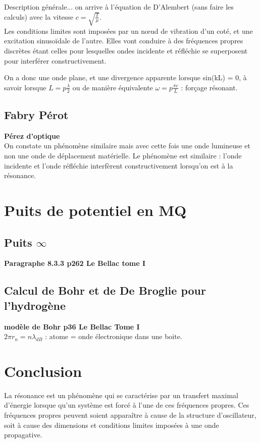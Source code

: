 \documentclass[12pt,prb,aps,epsf]{article}
\begin{document}
Description générale... on arrive à l'équation de D'Alembert (sans faire les calculs) avec la vitesse $c = \sqrt{\frac{T}{\mu}}$.\\

Les conditions limites sont imposées par un nœud de vibration d'un coté, et une excitation sinusoïdale de l'autre. Elles vont conduire à des fréquences propres discrètes étant celles pour lesquelles ondes incidente et réfléchie se superposent pour interférer constructivement.

On a donc une onde plane, et une divergence apparente lorsque sin(kL) = 0, à savoir lorsque $L= p\frac{\lambda}{2}$ ou de manière équivalente $\omega = p \frac{\pi c }{L}$ : forçage résonant. 

\subsection{Fabry Pérot}
\textbf{Pérez d'optique}\\
On constate un phénomène similaire mais avec cette fois une onde lumineuse et non une onde de déplacement matérielle. Le phénomène est similaire : l'onde incidente et l'onde réfléchie interfèrent constructivement lorsqu'on est à la résonance.

\section{Puits de potentiel en MQ}
\subsection{Puits $\infty$}
\textbf{Paragraphe 8.3.3 p262 Le Bellac tome I}

\subsection{Calcul de Bohr et de De Broglie pour l'hydrogène}
\textbf{modèle de Bohr p36 Le Bellac Tome I}\\
$2\pi r_n = n\lambda_{dB}$ : atome = onde électronique dans une boite.

\section{Conclusion}
La résonance est un phénomène qui se caractérise par un transfert maximal d'énergie lorsque qu'un système est forcé à l'une de ces fréquences propres. Ces fréquences propres peuvent soient apparaître à cause de la structure d'oscillateur, soit à cause des dimensions et conditions limites imposées à une onde propagative.
\end{document}
